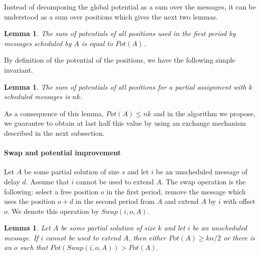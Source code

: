 \documentclass[10pt, conference, letterpaper]{IEEEtran}
\newtheorem{lemma}[theorem]{Lemma}
\begin{document}
Instead of decomposing the global potential as a sum over the messages, it can be understood
as a sum over positions which gives the next two lemmas.

\begin{lemma}\label{lemma:pot_pos}
The sum of potentials of all positions used in the first period by messages scheduled by $A$ is equal to $Pot(A)$.  
\end{lemma}

By definition of the potential of the positions, we have the following simple invariant.

\begin{lemma}\label{lemma:inv}
The sum of potentials of all positions for a partial assignment with $k$ scheduled messages is $nk$.  
\end{lemma}

 As a consequence of this lemma, $Pot(A) \leq nk$ and in the algorithm we 
 propose, we guarantee to obtain at last half this value by using an exchange mechanism described in the next subsection.

\paragraph{Swap and potential improvement}


Let $A$ be some partial solution of size $s$ and let $i$ be an unscheduled message of delay $d$. 
Assume that $i$ cannot be used to extend $A$. The swap operation is the following: 
select a free position $o$ in the first period, remove the message which uses the position $o+d$ in the second period from $A$ and extend $A$ by $i$ with offset $o$. We denote this operation by $Swap(i,o,A)$.

\begin{lemma}\label{lemma:swap}
Let $A$ be some partial solution of size $k$ and let $i$ be an unscheduled message. If $i$ cannot be used to extend $A$, then either $Pot(A) \geq kn/2$ or there is an $o$ such that $Pot(Swap(i,o,A)) > Pot(A)$.
\end{lemma}
\end{document}

